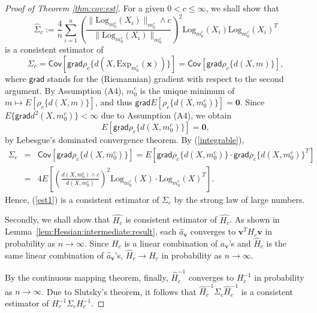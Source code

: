 \documentclass[preprint]{imsart}
\def\vv{\mathbf v}
\theoremstyle{plain}
\theoremstyle{remark}
\begin{document}
\begin{appendix}
\begin{proof}[Proof of Theorem \ref{thm:cov:est}]
For a given $0 < c \le \infty$, we shall show that 
\begin{equation}\label{est1}
\hat{\Sigma}_{c} := \frac{4}{n}\sum_{i=1}^{n} (\frac{\|\mbox{Log}_{m^{c}_{0}}(X_i)\|_{m^c_{0}} \wedge c}{\|\mbox{Log}_{m^{c}_{0}}(X_i)\|_{m^c_{0}}})^2 \mbox{Log}_{m^{c}_{0}}(X_i) \mbox{Log}_{m^{c}_{0}}(X_i)^{T}
\end{equation}
is a consistent estimator of $$\Sigma_{c}=\textsf{Cov}[\textsf{grad} \rho_{c}\{d(X, \mbox{Exp}_{m^{c}_0}(\mathbf{\mathbf{x}}))\}] = \textsf{Cov}[\textsf{grad}\rho_{c}\{d(X, m)\}],$$ where $\textsf{grad}$ stands for the (Riemannian) gradient with respect to the second argument. By Assumption (A4), $m^{c}_0$ is the unique minimum of $m \mapsto E [\rho_{c}\{d(X, m) \}]$, and thus $\textsf{grad}E [\rho_{c}\{d(X, m^{c}_{0})\}] = \mathbf{0}$. Since $E \{\textsf{grad}d^2(X, m^{c}_0)\} < \infty$ due to Assumption (A4), we obtain
\begin{equation}\label{integrable}
E [\textsf{grad}\rho_{c}\{d(X, m^{c}_0)\}] = \mathbf{0},
\end{equation}
by Lebesgue's dominated convergence theorem. By (\ref{integrable}),
\begin{eqnarray*}
\Sigma_{c} &=& \textsf{Cov}[\textsf{grad}\rho_{c}\{d(X, m^{c}_0)\}] = E [\textsf{grad}\rho_{c}\{d(X, m^{c}_0)\} \cdot \textsf{grad}\rho_{c}\{d(X, m^{c}_0)\}^{T}]\\ 
&=& 4E[(\frac{d(X, m^{c}_{0}) \wedge c}{d(X, m^{c}_{0})})^2 \mbox{Log}_{m^{c}_{0}}(X)\cdot \mbox{Log}_{m^{c}_{0}}(X)^T].
\end{eqnarray*}
Hence, (\ref{est1}) is a consistent estimator of $\Sigma_{c}$ by the strong law of large numbers. 

Secondly, we shall show that $\hat{H_{c}}$ is consistent estimator of $\hat{H_{c}}$. As shown in Lemma~\ref{lem:Hessian:intermediate:result}, each $\hat{a}_\vv$ converges to $\vv^TH_c \vv$ in probability as $n \rightarrow \infty$. Since $H_c$ is a linear combination of $a_\vv$'s and $\hat{H}_c$ is the same linear combination of $\hat{a}_\vv$'s, $\hat{H}_c \rightarrow H_c$ in probability as $n \to \infty$.

By the continuous mapping theorem, finally, $\hat{H}^{-1}_{c}$ converges to $H^{-1}_{c}$ in probability as $n \rightarrow \infty$. Due to Slutsky's theorem, it follows that $\hat{H}^{-1}_{c}\Sigma_{c}\hat{H}^{-1}_{c}$ is a consistent estimator of $H^{-1}_{c}\Sigma_{c}H^{-1}_{c}$. 
\end{proof} 











\end{appendix}
\end{document}
